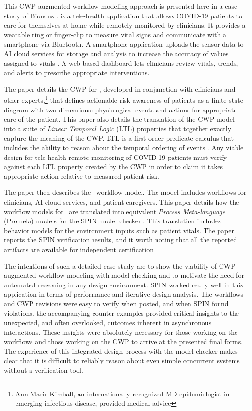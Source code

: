 This CWP augmented-workflow modeling approach is presented here in a case study of Bionous \phware. \phware is a tele-health application that allows COVID-19 patients to care for themselves at home while remotely monitored by clinicians. It provides a wearable ring or finger-clip to measure vital signs and communicate with a smartphone via Bluetooth. A smartphone application uploads the sensor data to AI cloud services for storage and analysis to increase the accuracy of values assigned to vitals \cite{Altschul2004PredictiveMI,10.2307/2984877,10.5555/1643031.1643047}. A web-based dashboard lets clinicians review vitals, trends, and alerts to prescribe appropriate interventions. 

The paper details the CWP for \phware, developed in conjunction with clinicians and other experts,\footnote{Ann Marie Kimball, an internationally recognized MD epidemiologist in emerging infectious disease, provided medical advice} that defines actionable risk awareness of patients as a finite state diagram with two dimensions: physiological events and actions for appropriate care of the patient. This paper also details the translation of the CWP model into a suite of \emph{Linear Temporal Logic} (LTL) properties that together exactly capture the meaning of the CWP. LTL is a first-order predicate calculus that includes the ability to reason about the temporal ordering of events \cite{10.5555/975331}. Any viable design for tele-health remote monitoring of COVID-19 patients must verify against each LTL property created by the CWP in order to claim it takes appropriate action relative to measured patient risk.

The paper then describes the \phware\ workflow model. The model includes workflows for clinicians, AI cloud services, and patient-caregivers. This paper details how the workflow models for \phware\ are translated into equivalent \emph{Process Meta-language} (Promela) models for the SPIN model checker \cite{spin}. This translation includes behavior models for the environment inputs such as patient vitals. The paper reports the SPIN verification results, and it worth noting that all the reported artifacts are available for independent certification \cite{repo}.

The intentions of such a detailed case study are to show the viability of CWP augmented workflow modeling with model checking and to motivate the need for automated reasoning in any design environment. SPIN worked really well in this application in terms of performance and iterative design analysis. The workflows and CWP revisions were easy to verify when posted, and when SPIN found violations, the accompanying counter-examples provided critical insights to the unexpected, and often overlooked, outcomes inherent in asynchronous interactions. These insights were absolutely necessary for those working on the workflows and those working on the CWP to arrive at the presented final forms. The experience of this integrated design process with the model checker makes clear that it is difficult to reliably reason about even simple concurrent systems without a verification tool.

